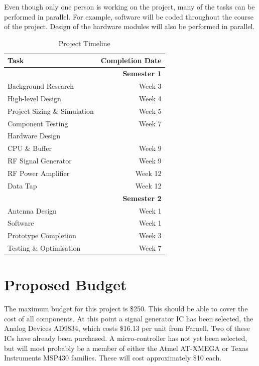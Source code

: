 \documentclass[a4paper,12pt]{article}
\begin{document}
Even though only one person is working on the project, many of the tasks can be performed in parallel. For example, software will be coded throughout the course of the project. Design of the hardware modules will also be performed in parallel. 



\begin{table}[h!]
\begin{center}
\begin{tabular}{l|r}
\textbf{Task} & \textbf{Completion Date}\\
\hline
& \textbf{Semester 1}\\
Background Research & Week 3\\
High-level Design & Week 4\\
Project Sizing \& Simulation & Week 5\\
Component Testing & Week 7\\
Hardware Design& \\
\hspace{15pt}CPU \& Buffer & Week 9\\
\hspace{15pt}RF Signal Generator & Week 9\\
\hspace{15pt}RF Power Amplifier & Week 12\\
\hspace{15pt}Data Tap & Week 12\\
& \textbf{Semester 2}\\
\hspace{15pt}Antenna Design & Week 1\\
Software & Week 1\\
Prototype Completion & Week 3\\
Testing \& Optimisation & Week 7\\
\end{tabular}
\caption{Project Timeline}
\label{timeline}
\end{center}
\end{table}

\section{Proposed Budget}
The maximum budget for this project is \$250. This should be able to cover the cost of all components. At this point a signal generator IC has been selected, the Analog Devices AD9834, which costs \$16.13 per unit from Farnell. Two of these ICs have already been purchased. A micro-controller has not yet been selected, but will most probably be a member of either the Atmel AT-XMEGA or Texas Instruments MSP430 families. These will cost approximately \$10 each. 
\end{document}
